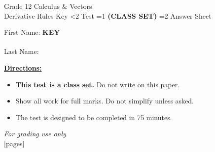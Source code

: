 \documentclass[addpoints]{exam}
\newcommand{\event}{Derivative Rules}
\newcommand{\tournament}{}
\def\type{0}
\begin{document}
\begin{center}
    {\huge Grade 12 Calculus \& Vectors \\ \event
    \ifprintanswers \space Key
    \else \space \ifnum\type<2 Test \fi \ifnum\type=1 \textbf{(CLASS SET)} \fi
          \ifnum\type=2 Answer Sheet \fi
    \fi \\ \vspace{3mm}\tournament\vspace{1mm}}
\end{center}

\vspace{.25\textheight}

\begin{center}
    First Name: \ifprintanswers
    \underline{\hspace{3.5cm}}\textbf{KEY}\underline{\hspace{5.5cm}}\\\vspace{5mm}
    \else \underline{\hspace{10cm}}\\ \vspace{5mm} \fi
    Last Name: \underline{\hspace{10cm}}\\ \vspace{5mm}
\end{center}

\noindent\textbf{\underline{Directions:}}
\begin{itemize}
    \ifnum\type=1 \item \textbf{This test is a class set.} Do not write on this paper. \fi
    \item Show all work for full marks. Do not simplify unless asked.
    \item The test is designed to be completed in 75 minutes.
\end{itemize}
\begin{center}
\textit{For grading use only}\\
[pages]
\end{center}
\end{document}
